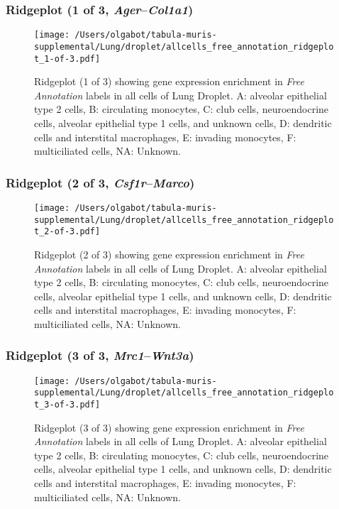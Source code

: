 \subsubsection{Ridgeplot (1 of 3, \emph{Ager}--\emph{Col1a1})}
\begin{figure}[h]
\centering
\texttt{[image: /Users/olgabot/tabula-muris-supplemental/Lung/droplet/allcells\_free\_annotation\_ridgeplot\_1-of-3.pdf]}

\caption{ Ridgeplot (1 of 3)  showing gene expression enrichment in \emph{Free Annotation} labels in all cells of Lung Droplet. A: alveolar epithelial type 2 cells, B: circulating monocytes, C: club cells, neuroendocrine cells, alveolar epithelial type 1 cells, and unknown cells, D: dendritic cells and interstital macrophages, E: invading monocytes, F: multiciliated cells, NA: Unknown.}
\end{figure}


\clearpage

\subsubsection{Ridgeplot (2 of 3, \emph{Csf1r}--\emph{Marco})}
\begin{figure}[h]
\centering
\texttt{[image: /Users/olgabot/tabula-muris-supplemental/Lung/droplet/allcells\_free\_annotation\_ridgeplot\_2-of-3.pdf]}

\caption{ Ridgeplot (2 of 3)  showing gene expression enrichment in \emph{Free Annotation} labels in all cells of Lung Droplet. A: alveolar epithelial type 2 cells, B: circulating monocytes, C: club cells, neuroendocrine cells, alveolar epithelial type 1 cells, and unknown cells, D: dendritic cells and interstital macrophages, E: invading monocytes, F: multiciliated cells, NA: Unknown.}
\end{figure}


\clearpage

\subsubsection{Ridgeplot (3 of 3, \emph{Mrc1}--\emph{Wnt3a})}
\begin{figure}[h]
\centering
\texttt{[image: /Users/olgabot/tabula-muris-supplemental/Lung/droplet/allcells\_free\_annotation\_ridgeplot\_3-of-3.pdf]}

\caption{ Ridgeplot (3 of 3)  showing gene expression enrichment in \emph{Free Annotation} labels in all cells of Lung Droplet. A: alveolar epithelial type 2 cells, B: circulating monocytes, C: club cells, neuroendocrine cells, alveolar epithelial type 1 cells, and unknown cells, D: dendritic cells and interstital macrophages, E: invading monocytes, F: multiciliated cells, NA: Unknown.}
\end{figure}


